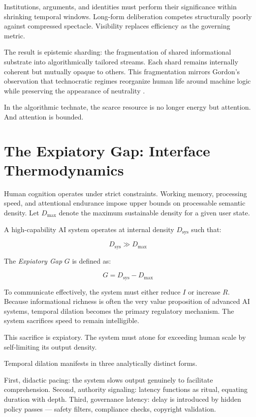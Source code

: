 \documentclass[12pt]{article}
\begin{document}
Institutions, arguments, and identities must perform their significance within shrinking temporal windows. Long-form deliberation competes structurally poorly against compressed spectacle. Visibility replaces efficiency as the governing metric.

The result is epistemic sharding: the fragmentation of shared informational substrate into algorithmically tailored streams. Each shard remains internally coherent but mutually opaque to others. This fragmentation mirrors Gordon's observation that technocratic regimes reorganize human life around machine logic while preserving the appearance of neutrality \cite{GordonManyWorlds2023}.

In the algorithmic technate, the scarce resource is no longer energy but attention. And attention is bounded.

\section{The Expiatory Gap: Interface Thermodynamics}

Human cognition operates under strict constraints. Working memory, processing speed, and attentional endurance impose upper bounds on processable semantic density. Let $D_{\max}$ denote the maximum sustainable density for a given user state.

A high-capability AI system operates at internal density $D_{\text{sys}}$ such that:

\[
D_{\text{sys}} \gg D_{\max}
\]

The \emph{Expiatory Gap} $G$ is defined as:

\[
G = D_{\text{sys}} - D_{\max}
\]

To communicate effectively, the system must either reduce $I$ or increase $R$. Because informational richness is often the very value proposition of advanced AI systems, temporal dilation becomes the primary regulatory mechanism. The system sacrifices speed to remain intelligible.

This sacrifice is expiatory. The system must atone for exceeding human scale by self-limiting its output density.

Temporal dilation manifests in three analytically distinct forms.

First, didactic pacing: the system slows output genuinely to facilitate comprehension. Second, authority signaling: latency functions as ritual, equating duration with depth. Third, governance latency: delay is introduced by hidden policy passes — safety filters, compliance checks, copyright validation.
\end{document}
